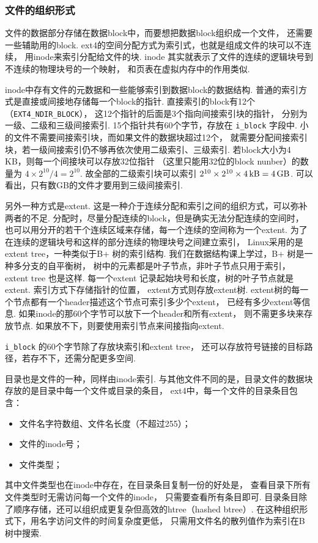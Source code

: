 \subsubsection{文件的组织形式}
文件的数据部分存储在数据block中，而要想把数据block组织成一个文件，
还需要一些辅助用的block.
ext4的空间分配方式为索引式，也就是组成文件的块可以不连续，
用inode来索引分配给文件的块.
inode 其实就表示了文件的连续的逻辑块号到不连续的物理块号的一个映射，
和页表在虚拟内存中的作用类似.

inode中存有文件的元数据和一些能够索引到数据block的数据结构.
普通的索引方式是直接或间接地存储每一个block的指针.
直接索引的block有12个（\lstinline{EXT4_NDIR_BLOCK}），
这12个指针的后面是3个指向间接索引块的指针，
分别为一级、二级和三级间接索引.
15个指针共有60个字节，存放在 \lstinline{i_block} 字段中.
小的文件不需要间接索引块，而如果文件的数据块超过12个，
就需要分配间接索引块，若一级间接索引仍不够再依次使用二级索引、三级索引.
若block大小为4 KB，则每一个间接块可以存放32位指针
（这里只能用32位的block nunber）的数量为 $4\times2^{10}/4 = 2^{10}$.
故全部的二级索引块可以索引 $2^{10}\times2^{10}\times\SI{4}{\kilo\byte} = \SI{4}{\giga\byte}$.
可以看出，只有数GB的文件才要用到三级间接索引.

另外一种方式是extent.
这是一种介于连续分配和索引之间的组织方式，可以弥补两者的不足.
分配时，尽量分配连续的block，但是确实无法分配连续的空间时，
也可以用分开的若干个连续区域来存储，每一个连续的空间称为一个extent. 
为了在连续的逻辑块号和这样的部分连续的物理块号之间建立索引，
Linux采用的是extent tree，一种类似于B+ 树的索引结构.
我们在数据结构课上学过，B+ 树是一种多分支的自平衡树，
树中的元素都是叶子节点，非叶子节点只用于索引，
extent tree 也是这样.
每一个extent 记录起始块号和长度，树的叶子节点就是extent.
索引方式下存储指针的位置，
extent方式则存放extent树.
extent树的每一个节点都有一个header描述这个节点可索引多少个extent，
已经有多少extent等信息.
如果inode的那60个字节可以放下一个header和所有extent，
则不需更多块来存放节点.
如果放不下，则要使用索引节点来间接指向extent.\cite{Ext4Extent}

\lstinline{i_block} 的60个字节除了存放块索引和extent tree，
还可以存放符号链接的目标路径，若存不下，还需分配更多空间.

目录也是文件的一种，同样由inode索引.
与其他文件不同的是，目录文件的数据块存放的是目录中每一个文件或目录的条目，
ext4中，每一个文件的目录条目包含：
\begin{itemize}
	\item 文件名字符数组、文件名长度（不超过255）；
	\item 文件的inode号；
	\item 文件类型；
\end{itemize}
其中文件类型也在inode中存在，在目录条目复制一份的好处是，
查看目录下所有文件类型时无需访问每一个文件的inode，
只需要查看所有条目即可.\cite{ext4dynamic}
目录条目除了顺序存储，还可以组织成更复杂但高效的htree（hashed btree）. 
在这种组织形式下，用名字访问文件的时间复杂度更低，
只需用文件名的散列值作为索引在B树中搜索.

